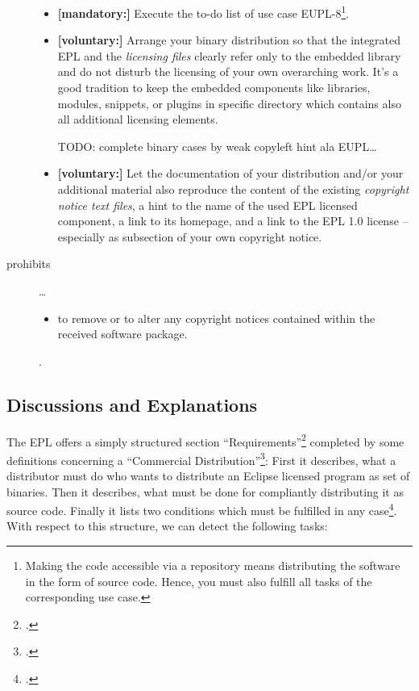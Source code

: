 \begin{description}
\begin{itemize}
  \item \textbf{[mandatory:]} Execute the to-do list of use case EUPL-8\footnote{
  Making the code accessible via a repository means distributing the software in
  the form of source code. Hence, you must also fulfill all tasks of the
  corresponding use case.}.
  
  \item \textbf{[voluntary:]} Arrange your binary distribution so that the
  integrated EPL and the \emph{licensing files} clearly refer only to the
  embedded library and do not disturb the licensing of your own overarching
  work. It's a good tradition to keep the embedded components like libraries,
  modules, snippets, or plugins in specific directory which contains also all
  additional licensing elements.

  TODO: complete binary cases by weak copyleft hint ala EUPL\ldots
  

  \item \textbf{[voluntary:]} Let the documentation of your distribution and/or
  your additional material  also reproduce the content of the existing
  \emph{copyright notice text files}, a hint to the name of the used EPL
  licensed component, a link to its homepage, and a link to the EPL 1.0 license
  -- especially as subsection of your own copyright notice.
  
\end{itemize}

\item[prohibits] \ldots
\begin{itemize}
  \item to remove or to alter any copyright notices contained within the
  received software package.
\end{itemize}.

\end{description}

\subsection{Discussions and Explanations}

The EPL offers a simply structured section
\enquote{Requirements}\footcite[cf.][\nopage wp\ §3]{Epl10OsiLicense2005a}
completed by some definitions concerning a \enquote{Commercial
Distribution}\footcite[cf.][\nopage wp\ §4]{Epl10OsiLicense2005a}: First it
describes, what a distributor must do who wants to distribute an Eclipse
licensed program as set of binaries. Then it describes, what must be done for
compliantly distributing it as source code. Finally it lists two conditions
which must be fulfilled in any case\footcite[cf.][\nopage wp\
§3]{Epl10OsiLicense2005a}. With respect to this structure, we can detect the
following tasks:

